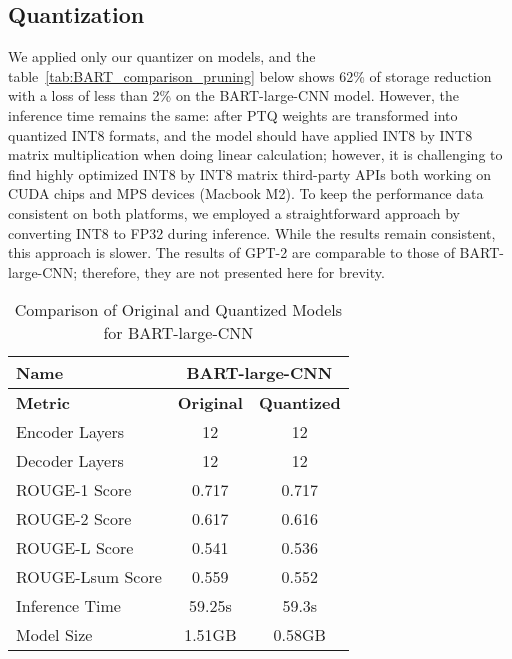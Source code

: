 \subsection{Quantization}

We applied only our quantizer on models, and the table~\ref{tab:BART_comparison_pruning} below shows 62\% of storage reduction with a loss of less than 2\% on the BART-large-CNN model. However, the inference time remains the same: after PTQ weights are transformed into quantized INT8 formats, and the model should have applied INT8 by INT8 matrix multiplication when doing linear calculation; however, it is challenging to find highly optimized INT8 by INT8 matrix third-party APIs both working on CUDA chips and MPS devices (Macbook M2). To keep the performance data consistent on both platforms, we employed a straightforward approach by converting INT8 to FP32 during inference. While the results remain consistent, this approach is slower. The results of GPT-2 are comparable to those of BART-large-CNN; therefore, they are not presented here for brevity.

\begin{table}[h!]
    \centering
    \begin{tabular}{lcc}
        \toprule
        \textbf{Name}         & \multicolumn{2}{c}{\textbf{BART-large-CNN}} \\ \midrule
        \textbf{Metric}       & \textbf{Original} & \textbf{Quantized} \\ \midrule
        Encoder Layers        & 12                     & 12                     \\
        Decoder Layers        & 12                     & 12                     \\
        ROUGE-1 Score         & 0.717                  & 0.717                  \\
        ROUGE-2 Score         & 0.617                  & 0.616                  \\
        ROUGE-L Score         & 0.541                  & 0.536                  \\
        ROUGE-Lsum Score      & 0.559                  & 0.552                  \\
        Inference Time        & 59.25s                 & 59.3s                  \\
        Model Size            & 1.51GB                 & 0.58GB                 \\ \bottomrule
    \end{tabular}
    \caption{Comparison of Original and Quantized Models for BART-large-CNN}
    \label{tab:BART_comparison_q}
\end{table}

